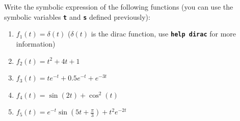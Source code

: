 \documentclass{article}
\begin{document}

\begin{par}
\begin{flushleft}
Write the symbolic expression of the following functions (you can use the symbolic variables \texttt{\textbf{t}} and \texttt{\textbf{s}} defined previously):
\end{flushleft}
\end{par}

\begin{enumerate}
\setlength{\itemsep}{-1ex}
   \item{\begin{flushleft} $f_1 (t)=\delta (t)$ ($\delta (t)$ is the dirac function, use \texttt{\textbf{help dirac}} for more information) \end{flushleft}}
   \item{\begin{flushleft} $\displaystyle f_2 (t)=t^2 +4t+1$ \end{flushleft}}
   \item{\begin{flushleft} $\displaystyle f_3 (t)=te^{-t} +0.5e^{-t} +e^{-3t}$ \end{flushleft}}
   \item{\begin{flushleft} $\displaystyle f_4 (t)=\sin (2t)+\cos^2 (t)$ \end{flushleft}}
   \item{\begin{flushleft} $\displaystyle f_5 (t)=e^{-t} \sin (5t+\frac{\pi }{3})+t^2 e^{-2t}$ \end{flushleft}}
\end{enumerate}
\end{document}
